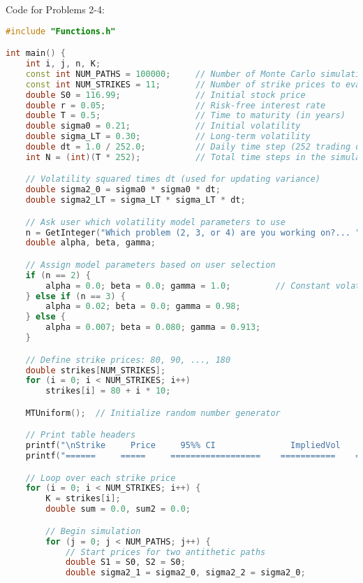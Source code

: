 \documentclass{report}
\begin{document}
Code for Problems 2-4:
\begin{lstlisting}[language=C++]
#include "Functions.h"

int main() {
    int i, j, n, K;
    const int NUM_PATHS = 100000;     // Number of Monte Carlo simulations
    const int NUM_STRIKES = 11;       // Number of strike prices to evaluate
    double S0 = 116.99;               // Initial stock price
    double r = 0.05;                  // Risk-free interest rate
    double T = 0.5;                   // Time to maturity (in years)
    double sigma0 = 0.21;             // Initial volatility
    double sigma_LT = 0.30;           // Long-term volatility
    double dt = 1.0 / 252.0;          // Daily time step (252 trading days/year)
    int N = (int)(T * 252);           // Total time steps in the simulation

    // Volatility squared times dt (used for updating variance)
    double sigma2_0 = sigma0 * sigma0 * dt;
    double sigma2_LT = sigma_LT * sigma_LT * dt;

    // Ask user which volatility model parameters to use
    n = GetInteger("Which problem (2, 3, or 4) are you working on?... ");
    double alpha, beta, gamma;

    // Assign model parameters based on user selection
    if (n == 2) {
        alpha = 0.0; beta = 0.0; gamma = 1.0;         // Constant volatility
    } else if (n == 3) {
        alpha = 0.02; beta = 0.0; gamma = 0.98;       
    } else {
        alpha = 0.007; beta = 0.080; gamma = 0.913;   
    }

    // Define strike prices: 80, 90, ..., 180
    double strikes[NUM_STRIKES];
    for (i = 0; i < NUM_STRIKES; i++)
        strikes[i] = 80 + i * 10;

    MTUniform();  // Initialize random number generator

    // Print table headers
    printf("\nStrike     Price     95%% CI               ImpliedVol     LowerCI     UpperCI\n");
    printf("======     =====     ==================    ===========    ========    ========\n");

    // Loop over each strike price
    for (i = 0; i < NUM_STRIKES; i++) {
        K = strikes[i];
        double sum = 0.0, sum2 = 0.0;

        // Begin simulation
        for (j = 0; j < NUM_PATHS; j++) {
            // Start prices for two antithetic paths
            double S1 = S0, S2 = S0;                     
            double sigma2_1 = sigma2_0, sigma2_2 = sigma2_0;


\end{lstlisting}
\end{document}
